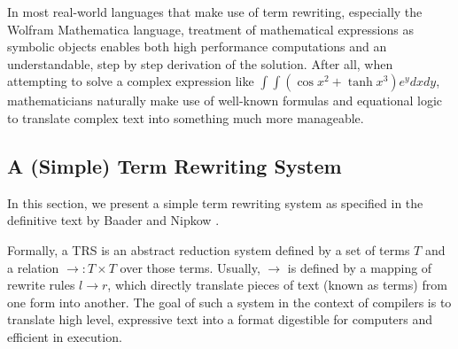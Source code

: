 \documentclass{article}
\begin{document}
In most real-world languages that make use of term rewriting, especially the Wolfram Mathematica language,
treatment of mathematical expressions as symbolic objects enables both high performance computations
and an understandable, step by step derivation of the solution. After all, when attempting to solve
a complex expression like $\int \int (\cos{x}^2 + \tanh{x}^3)e^y dx dy$, mathematicians naturally make use
of well-known formulas and equational logic to translate complex text into something much more manageable.












\subsection{A (Simple) Term Rewriting System}

In this section, we present a simple term rewriting system as specified in the definitive text by Baader and Nipkow \cite{baader1998term}.

Formally, a TRS is an abstract reduction system defined by a set of terms $T$ and a relation $\rightarrow: T \times T$ over those terms.
Usually, $\rightarrow$ is defined by a mapping of rewrite rules $l \rightarrow r$, which directly translate pieces of text (known as terms) from one form into another.
The goal of such a system in the context of compilers is to translate high level, expressive text into a format digestible for computers and efficient in execution.
\end{document}
